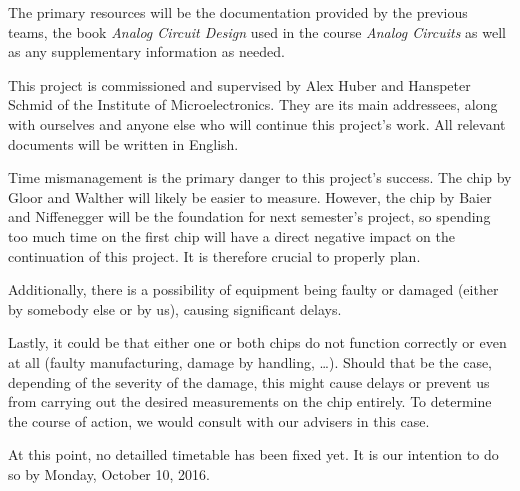 \documentclass[a4paper,10pt]{article}
\begin{document}
The  primary resources  will be  the  documentation provided  by the  previous
teams, the book  \emph{Analog Circuit Design} used in  the course \emph{Analog
Circuits} as well as any supplementary information as needed.

This project is commissioned and supervised by Alex Huber and Hanspeter Schmid
of the Institute of Microelectronics. They are its main addressees, along with
ourselves and anyone else who will continue this project's work.  All relevant
documents will be written in English.

Time mismanagement is the primary danger  to this project's success.  The chip
by Gloor  and Walther will likely  be easier to measure. However,  the chip by
Baier and Niffenegger  will be the foundation for next  semester's project, so
spending too much time on the first chip will have a direct negative impact on
the continuation of this project.  It is therefore crucial to properly plan.

Additionally,  there is  a possibility  of equipment  being faulty  or damaged
(either by somebody else or by us), causing significant delays.

Lastly, it could be that either one or both chips do not function correctly or
even at all (faulty manufacturing, damage by handling, \ldots). Should that be
the case, depending of the severity of  the damage, this might cause delays or
prevent us from carrying out the desired measurements on the chip entirely. To
determine the  course of action,  we would consult  with our advisers  in this
case.

At this point, no detailled timetable  has been fixed yet. It is our intention
to do so by Monday, October 10, 2016.
\end{document}

